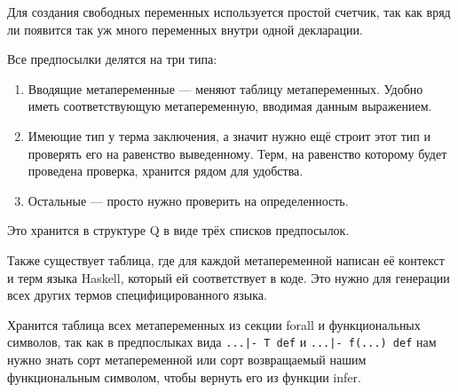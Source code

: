 Для создания свободных переменных используется простой счетчик, так как вряд ли появится так уж много переменных внутри одной декларации.

Все предпосылки делятся на три типа:
\begin{enumerate}
  \item Вводящие метапеременные --- меняют таблицу метапеременных. Удобно иметь соответствующую метапеременную, вводимая данным выражением.
  \item Имеющие тип у терма заключения, а значит нужно ещё строит этот тип и проверять его на равенство выведенному. Терм, на равенство которому будет проведена проверка, хранится рядом для удобства.
  \item Остальные --- просто нужно проверить на определенность.
\end{enumerate}

Это хранится в структуре Q в виде трёх списков предпосылок.

Также существует таблица, где для каждой метапеременной написан её контекст и терм языка Haskell, который ей соответствует в коде. Это нужно для генерации всех других термов специфицированного языка.

Хранится таблица всех метапеременных из секции forall и функциональных символов, так как в предпослыках вида \lstinline{...|- T def} и \lstinline{...|- f(...) def} нам нужно знать сорт метапеременной или сорт возвращаемый нашим функциональным символом, чтобы вернуть его из функции infer.



























